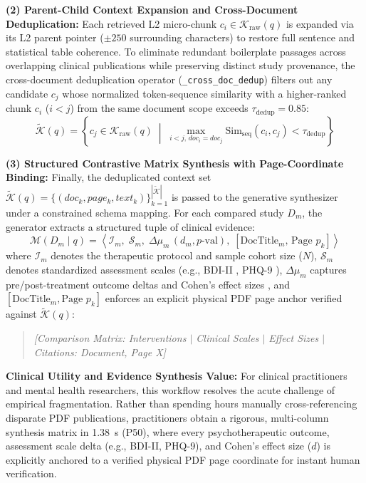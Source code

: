 \documentclass[10pt]{SPIIRAS_Proceedings}
\begin{document}
\textbf{(2) Parent-Child Context Expansion and Cross-Document Deduplication:} Each retrieved L2 micro-chunk $c_i \in \mathcal{K}_{\text{raw}}(q)$ is expanded via its L2 parent pointer ($\pm 250$ surrounding characters) to restore full sentence and statistical table coherence. To eliminate redundant boilerplate passages across overlapping clinical publications while preserving distinct study provenance, the cross-document deduplication operator (\texttt{\_cross\_doc\_dedup}) filters out any candidate $c_j$ whose normalized token-sequence similarity with a higher-ranked chunk $c_i$ ($i < j$) from the same document scope exceeds $\tau_{\text{dedup}} = 0.85$:
\begin{equation}
\widetilde{\mathcal{K}}(q) = \left\{ c_j \in \mathcal{K}_{\text{raw}}(q) \;\middle|\; \max_{i < j, \, doc_i = doc_j} \text{Sim}_{\text{seq}}(c_i, c_j) < \tau_{\text{dedup}} \right\}
\label{eq:cross_dedup}
\end{equation}

\textbf{(3) Structured Contrastive Matrix Synthesis with Page-Coordinate Binding:} Finally, the deduplicated context set $\widetilde{\mathcal{K}}(q) = \{(doc_k, page_k, text_k)\}_{k=1}^{|\widetilde{\mathcal{K}}|}$ is passed to the generative synthesizer under a constrained schema mapping. For each compared study $D_m$, the generator extracts a structured tuple of clinical evidence:
\begin{equation}
\mathcal{M}(D_m \mid q) = \left\langle \mathcal{I}_m, \; \mathcal{S}_m, \; \Delta\mu_m \, (d_m, p\text{-val}), \; [\text{DocTitle}_m, \, \text{Page } p_k] \right\rangle
\label{eq:synthesis_matrix}
\end{equation}
where $\mathcal{I}_m$ denotes the therapeutic protocol and sample cohort size ($N$), $\mathcal{S}_m$ denotes standardized assessment scales (e.g., BDI-II \cite{beck1996manual}, PHQ-9 \cite{kroenke2001phq}), $\Delta\mu_m$ captures pre/post-treatment outcome deltas and Cohen's effect sizes \cite{cohen1988statistical}, and $[\text{DocTitle}_m, \text{Page } p_k]$ enforces an explicit physical PDF page anchor verified against $\widetilde{\mathcal{K}}(q)$:
\begin{quote}
\small
\textit{[Comparison Matrix: Interventions $\mid$ Clinical Scales $\mid$ Effect Sizes $\mid$ Citations: Document, Page X]}
\end{quote}

\textbf{Clinical Utility and Evidence Synthesis Value:} For clinical practitioners and mental health researchers, this workflow resolves the acute challenge of empirical fragmentation. Rather than spending hours manually cross-referencing disparate PDF publications, practitioners obtain a rigorous, multi-column synthesis matrix in 1.38~s (P50), where every psychotherapeutic outcome, assessment scale delta (e.g., BDI-II, PHQ-9), and Cohen's effect size ($d$) is explicitly anchored to a verified physical PDF page coordinate for instant human verification.
\end{document}
